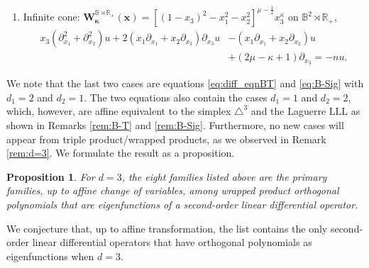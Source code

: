 \documentclass{amsart}
\newtheorem{prop}[thm]{Proposition}
\theoremstyle{remark}
\def\k{{\kappa}}
\def\xb{{\bm x}}
\def\Wb{{\bm W}}
\def\BB{{\mathbb B}}
\def\RR{{\mathbb R}}
\def\bk{{\boldsymbol{\kappa}}}
\def\f{\frac}
\begin{document}
\begin{enumerate}[   ]
\begin{align*}
  - (\k+2\mu +3) \left(x_1 \partial_{x_1} + x_2 \partial_{x_2} \right) u \\
&  \quad  + [ \k+1 -  (\k+2\mu +3) x_3 ] \partial_{x_3} u = - n (n+\k + 2 \mu + 2) u. 
\end{align*}
\item Infinite cone: $\Wb_\bk^{\BB\rtimes \RR_+}(\xb) = \left[(1- x_3)^2- x_1^2-x_2^2\right]^{\mu-\f12} x_3^{\k}$
   on $\BB^2 \rtimes \RR_+$, 
\begin{align*}
  x_3(\partial_{x_1}^2+\partial_{x_2}^2) u  + 2 (x_1 \partial_{x_1}+x_2 \partial_{x_2}) \partial_{x_3} u 
    &   -(x_1 \partial_{x_1}+x_2  \partial_{x_2}) u  \\
   & +(2 \mu-\k+1) \partial_{x_3} = -n u. 
\end{align*} 
\end{enumerate}

We note that the last two cases are equations \eqref{eq:diff_eqnBT} and \eqref{eq:B-Sig} with $d_1 =2$ 
and $d_2 = 1$. The two equations also contain the cases $d_1 = 1$ and $d_2 =2$, which, however, are affine 
equivalent to the simplex  $\triangle^3$ and the Laguerre $\mathrm{LLL}$ as shown in Remarks \ref{rem:B-T}
and \ref{rem:B-Sig}. Furthermore, no new cases will appear from triple product/wrapped products, as we 
observed in Remark \ref{rem:d=3}. We formulate the result as a proposition. 

\begin{prop} 
For $d = 3$, the eight families listed above are the primary families, up to affine change of variables, 
among wrapped product orthogonal polynomials that are eigenfunctions of a second-order linear differential 
operator. 
\end{prop}

We conjecture that, up to affine transformation, the list contains the only second-order linear differential 
operators that have orthogonal polynomials as eigenfunctions when $d =3$. 
 

\end{document}
